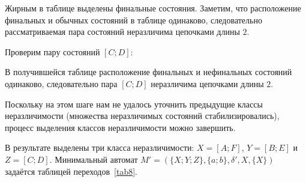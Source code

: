 \begin{myexample}
\begin{itemize}

Жирным в таблице выделены финальные состояния. Заметим, что расположение финальных и обычных состояний в таблице одинаково, следовательно рассматриваемая пара состояний неразличима цепочками длины $2$.

Проверим пару состояний  $[C;D]$:

В получившейся таблице расположение финальных и нефинальных состояний одинаково, следовательно пара $[C;D]$ неразличима цепочками длины $2$.

Поскольку на этом шаге нам не удалось уточнить предыдущие классы неразличимости (множества неразличимых состояний стабилизировались), процесс выделения классов неразличимости можно завершить.

В результате выделены три класса неразличимости: $X = [A;F]$, $Y = [B;E]$ и $Z = [C;D]$. Минимальный автомат $M' = (\{X;Y;Z\},\{a;b\},\delta',X,\{X\})$ задаётся таблицей переходов~\ref{tab8}.
\end{itemize}
\end{myexample}

